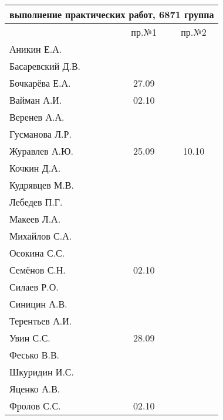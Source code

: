 \documentclass[a4paper,11pt]{article}
\begin{document}
\begin{tabular}{l|cc}
\multicolumn{3}{c}{выполнение практических работ, 6871 группа} \\
\toprule
& пр.№1 & пр.№2 \\
\midrule
Аникин Е.А.     &     &\\    
Басаревский Д.В.&     &\\
Бочкарёва Е.А.  &27.09&\\
Вайман А.И.     &02.10&\\
Веренев А.А.    &     &\\
Гусманова Л.Р.  &     &\\
Журавлев А.Ю.   &25.09&10.10\\
Кочкин Д.А.     &     &\\
Кудрявцев М.В.  &     &\\
Лебедев П.Г.    &     &\\
Макеев Л.А.     &     &\\
Михайлов С.А.   &     &\\
Осокина С.С.    &     &\\
Семёнов С.Н.    &02.10&\\
Силаев Р.О.     &     &\\
Синицин А.В.    &     &\\
Терентьев А.И.  &     &\\
Увин С.С.       &28.09&\\
Фесько В.В.     &     &\\
Шкуридин И.С.   &     &\\
Яценко А.В.     &     &\\
Фролов С.С.     &02.10&\\
\bottomrule
\end{tabular}
\end{document}
